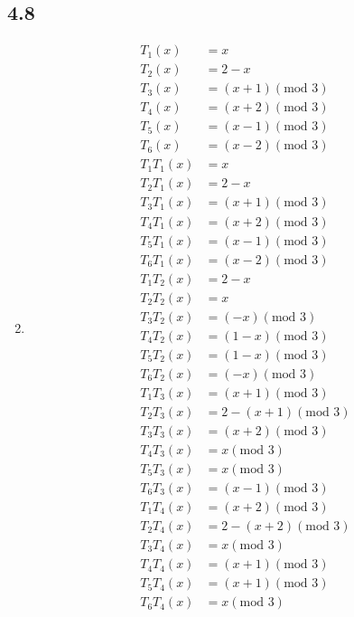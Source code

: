 \documentclass[a4paper,12pt]{article}
\begin{document}
	\subsection*{4.8}
	\begin{enumerate}
		\setcounter{enumi}{1}
		\item \begin{align*}
		T_1(x) &= x \\
		T_2(x) &= 2 - x \\
		T_3(x) &= (x + 1)(\mbox{mod }3) \\
		T_4(x) &= (x + 2)(\mbox{mod }3) \\
		T_5(x) &= (x - 1)(\mbox{mod }3) \\
		T_6(x) &= (x - 2)(\mbox{mod }3) \\
		T_1T_1(x) &= x \\
		T_2T_1(x) &= 2 - x \\
		T_3T_1(x) &= (x + 1)(\mbox{mod }3) \\
		T_4T_1(x) &= (x + 2)(\mbox{mod }3) \\
		T_5T_1(x) &= (x - 1)(\mbox{mod }3) \\
		T_6T_1(x) &= (x - 2)(\mbox{mod }3) \\
		T_1T_2(x) &= 2 - x \\
		T_2T_2(x) &= x \\
		T_3T_2(x) &= (-x)(\mbox{mod }3) \\
		T_4T_2(x) &= (1 - x)(\mbox{mod }3) \\
		T_5T_2(x) &= (1 - x)(\mbox{mod }3) \\
		T_6T_2(x) &= (-x)(\mbox{mod }3) \\
		T_1T_3(x) &= (x + 1)(\mbox{mod }3) \\
		T_2T_3(x) &= 2 - (x + 1)(\mbox{mod }3) \\
		T_3T_3(x) &= (x + 2)(\mbox{mod }3) \\
		T_4T_3(x) &= x(\mbox{mod }3) \\
		T_5T_3(x) &= x(\mbox{mod }3) \\
		T_6T_3(x) &= (x - 1)(\mbox{mod }3) \\
		T_1T_4(x) &= (x + 2)(\mbox{mod }3) \\
		T_2T_4(x) &= 2 - (x + 2)(\mbox{mod }3) \\
		T_3T_4(x) &= x(\mbox{mod }3) \\
		T_4T_4(x) &= (x + 1)(\mbox{mod }3) \\
		T_5T_4(x) &= (x + 1)(\mbox{mod }3) \\
		T_6T_4(x) &= x(\mbox{mod }3) \\

\end{align*}
\end{enumerate}
\end{document}
